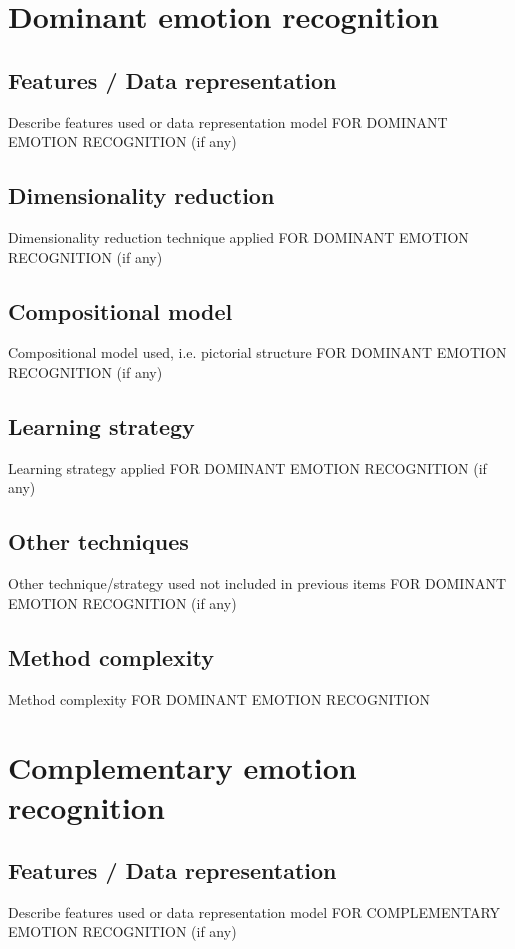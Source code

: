 \documentclass{article}
\begin{document}
\section{Dominant emotion recognition}
\subsection{Features / Data representation}
Describe features used or data representation model FOR DOMINANT EMOTION RECOGNITION (if any)

\subsection{Dimensionality reduction}
Dimensionality reduction technique applied FOR DOMINANT EMOTION RECOGNITION (if any)

\subsection{Compositional model}
Compositional model used, i.e. pictorial structure FOR DOMINANT EMOTION RECOGNITION (if any)

\subsection{Learning strategy}
Learning strategy applied FOR DOMINANT EMOTION RECOGNITION (if any)

\subsection{Other techniques}
Other technique/strategy used not included in previous items FOR DOMINANT EMOTION RECOGNITION (if any)

\subsection{Method complexity}
Method complexity FOR DOMINANT EMOTION RECOGNITION


\section{Complementary emotion recognition}
\subsection{Features / Data representation}
Describe features used or data representation model FOR COMPLEMENTARY EMOTION RECOGNITION (if any)
\end{document}
